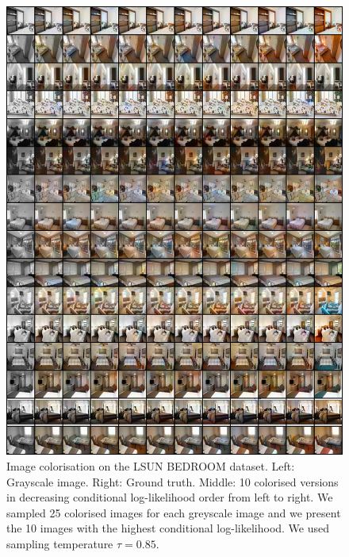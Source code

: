 \begin{figure}[h!]
    \centering
    \includegraphics[width=\textwidth]{Chapter1/paper_graphs/SupplementaryMaterial/colorization_lsun_0.85_2.png}
    \caption{Image colorisation on the LSUN BEDROOM dataset. Left: Grayscale image. Right: Ground truth. Middle: 10 colorised versions in decreasing conditional log-likelihood order from left to right. We sampled 25 colorised images for each greyscale image and we present the 10 images with the highest conditional log-likelihood. We used sampling temperature $\tau=0.85$.}
\end{figure}

